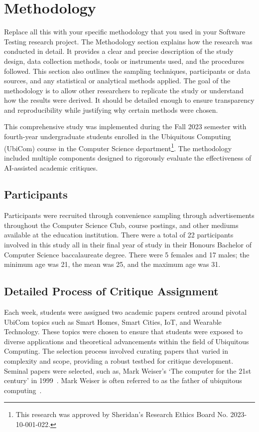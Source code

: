\section{Methodology}
\label{Methodology}

Replace all this with your specific methodology that you used in your Software Testing research project.  The Methodology section explains how the research was conducted in detail. It provides a clear and precise description of the study design, data collection methods, tools or instruments used, and the procedures followed. This section also outlines the sampling techniques, participants or data sources, and any statistical or analytical methods applied. The goal of the methodology is to allow other researchers to replicate the study or understand how the results were derived. It should be detailed enough to ensure transparency and reproducibility while justifying why certain methods were chosen. 

This comprehensive study was implemented during the Fall 2023 semester with fourth-year undergraduate students enrolled in the Ubiquitous Computing (UbiCom) course in the Computer Science department\footnote{This research was approved by Sheridan's Research Ethics Board No. 2023-10-001-022.}. The methodology included multiple components designed to rigorously evaluate the effectiveness of AI-assisted academic critiques.

\subsection{Participants}
Participants were recruited through convenience sampling through advertisements throughout the Computer Science Club, course postings, and other mediums available at the education institution.  There were a total of  22 participants involved in this study all in their final year of study in their Honours Bachelor of Computer Science baccalaureate degree.  There were 5 females and 17 males; the minimum age was 21, the mean was 25, and the maximum age was 31.

\subsection{Detailed Process of Critique Assignment}
Each week, students were assigned two academic papers centred around pivotal UbiCom topics such as Smart Homes, Smart Cities, IoT, and Wearable Technology. These topics were chosen to ensure that students were exposed to diverse applications and theoretical advancements within the field of Ubiquitous Computing. The selection process involved curating papers that varied in complexity and scope, providing a robust testbed for critique development.  Seminal papers were selected, such as, Mark Weiser's `The computer for the 21st century' in 1999~\cite{Weiser_1999}. Mark Weiser is often referred to as the father of ubiquitous computing~\cite{brown2020_language}.

